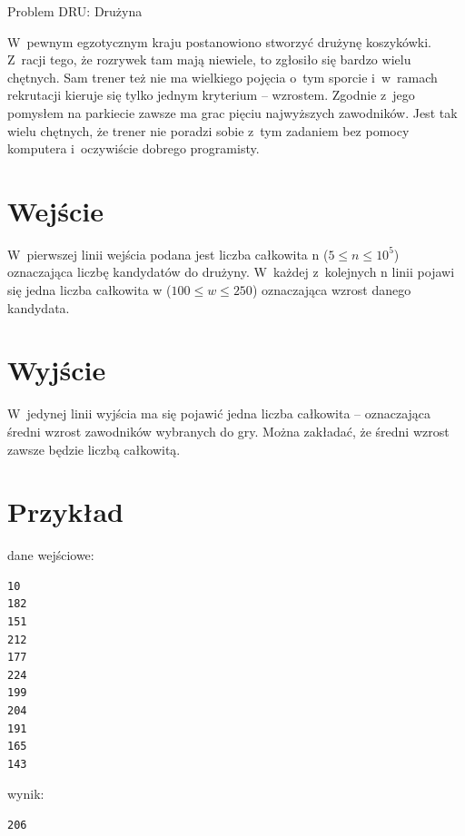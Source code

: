 \documentclass{article}
\begin{document}
\begin{multicols}{2}
\begin{center}
  \begin{Huge}
    Problem DRU: Drużyna
  \end{Huge}
\end{center}

W~pewnym egzotycznym kraju postanowiono stworzyć drużynę koszykówki. Z~racji tego, że
rozrywek tam mają niewiele, to zgłosiło się bardzo wielu chętnych. Sam trener też nie ma wielkiego
pojęcia o~tym sporcie i~w~ramach rekrutacji kieruje się tylko jednym kryterium – wzrostem.
Zgodnie z~jego pomysłem na parkiecie zawsze ma grac pięciu najwyższych zawodników. Jest tak
wielu chętnych, że trener nie poradzi sobie z~tym zadaniem bez pomocy komputera i~oczywiście
dobrego programisty.

\section*{Wejście}

W~pierwszej linii wejścia podana jest liczba całkowita n ($5 \leqslant n \leqslant 10^5$) oznaczająca liczbę
kandydatów do drużyny. W~każdej z~kolejnych n linii pojawi się jedna liczba całkowita w
($100 \leqslant w \leqslant 250$) oznaczająca wzrost danego kandydata.

\section*{Wyjście}

W~jedynej linii wyjścia ma się pojawić jedna liczba całkowita – oznaczająca średni wzrost
zawodników wybranych do gry. Można zakładać, że średni wzrost zawsze będzie liczbą całkowitą.

\section*{Przykład}
dane wejściowe:
\begin{verbatim}
10
182
151
212
177
224
199
204
191
165
143
\end{verbatim}
wynik:
\begin{verbatim}
206
\end{verbatim}
\end{multicols}
\end{document}
